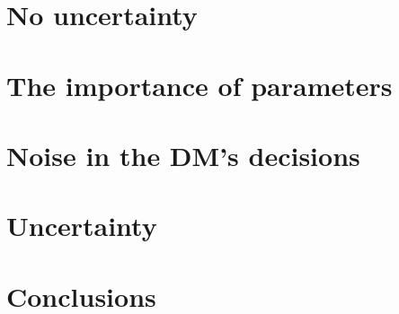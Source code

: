 \section{No uncertainty}

\section{The importance of parameters}

\section{Noise in the DM's decisions}

\section{Uncertainty}

\section{Conclusions}


